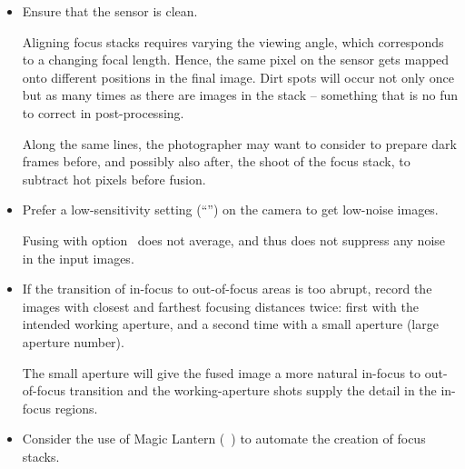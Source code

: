 \begin{itemize}
\item
  Ensure that the sensor is clean.

  Aligning focus stacks requires varying the viewing angle, which corresponds to a changing
  focal length.  Hence, the same pixel on the sensor gets mapped onto different positions in the
  final image.  Dirt spots will occur not only once but as many times as there are images in the
  stack -- something that is no fun to correct in post-processing.

  Along the same lines, the photographer may want to consider to prepare dark frames before, and
  possibly also after, the shoot of the focus stack, to subtract hot pixels before fusion.

\item
  Prefer a low-sensitivity setting (``'') on the camera to get low-noise images.

  Fusing with option~ does not average, and thus does
  not suppress any noise in the input images.

\item
  If the transition of in-focus to out-of-focus areas is too abrupt, record the images with
  closest and farthest focusing distances twice: first with the intended working aperture, and a
  second time with a small aperture (large aperture number).

  The small aperture will give the fused image a more natural in-focus to out-of-focus
  transition and the working-aperture shots supply the detail in the in-focus regions.

\item
  Consider the use of Magic Lantern (\appendixName~) to automate the
  creation of focus stacks.
\end{itemize}



